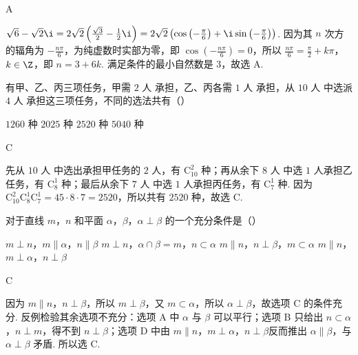 \begin{answer}
A
\end{answer}

\begin{solution}
\(\sqrt{6}-\sqrt{2}\i=2\sqrt{2}\left( \frac{\sqrt{3}}{2}-\frac{1}{2}\i \right)=2\sqrt{2}\left( \cos\left( -\frac{\pi}{6} \right)+\i\sin\left( -\frac{\pi}{6} \right) \right)\). 因为其 \(n\) 次方的辐角为 \(-\frac{n\pi}{6}\)，为纯虚数时实部为零，即 \(\cos\left( -\frac{n\pi}{6} \right)=0\)，所以 \(\frac{n\pi}{6}=\frac{\pi}{2}+k\pi\)，\(k\in\Z\)，即 \(n=3+6k\). 满足条件的最小自然数是 \(3\)，故选 A.
\end{solution}

\begin{problem}
有甲、乙、丙三项任务，甲需 \(2\text{ 人}\) 承担，乙、丙各需 \(1\text{ 人}\) 承担，从 \(10\text{ 人}\) 中选派 \(4\text{ 人}\) 承担这三项任务，不同的选法共有（\quad）

\choices
    {\(1260\text{ 种}\)}
    {\(2025\text{ 种}\)}
    {\(2520\text{ 种}\)}
    {\(5040\text{ 种}\)}
\end{problem}

\begin{answer}
C
\end{answer}

\begin{solution}
先从 \(10\text{ 人}\) 中选出承担甲任务的 \(2\text{ 人}\)，有 \(\mathrm C_{10}^{2}\) 种；再从余下 \(8\text{ 人}\) 中选 \(1\text{ 人}\)承担乙任务，有 \(\mathrm C_{8}^{1}\) 种；最后从余下 \(7\text{ 人}\) 中选 \(1\text{ 人}\)承担丙任务，有 \(\mathrm C_{7}^{1}\) 种. 因为 \(\mathrm C_{10}^{2}\mathrm C_{8}^{1}\mathrm C_{7}^{1}=45\cdot 8\cdot 7=2520\)，所以共有 \(2520\text{ 种}\)，故选 C.
\end{solution}

\begin{problem}
对于直线 \(m\)，\(n\) 和平面 \(\alpha\)，\(\beta\)，\(\alpha\perp\beta\) 的一个充分条件是（\quad）

\choices
    {\(m\perp n\)，\(m\parallel\alpha\)，\(n\parallel\beta\)}
    {\(m\perp n\)，\(\alpha\cap\beta=m\)，\(n\subset\alpha\)}
    {\(m\parallel n\)，\(n\perp\beta\)，\(m\subset\alpha\)}
    {\(m\parallel n\)，\(m\perp\alpha\)，\(n\perp\beta\)}
\end{problem}

\begin{answer}
C
\end{answer}

\begin{solution}
因为 \(m\parallel n\)，\(n\perp\beta\)，所以 \(m\perp\beta\)，又 \(m\subset\alpha\)，所以 \(\alpha\perp\beta\)，故选项 C 的条件充分. 反例检验其余选项不充分：选项 A 中 \(\alpha\) 与 \(\beta\) 可以平行；选项 B 只给出 \(n\subset\alpha\)，\(n\perp m\)，得不到 \(n\perp\beta\)；选项 D 中由 \(m\parallel n\)，\(m\perp\alpha\)，\(n\perp\beta\)反而推出 \(\alpha\parallel\beta\)，与 \(\alpha\perp\beta\) 矛盾. 所以选 C.
\end{solution}

